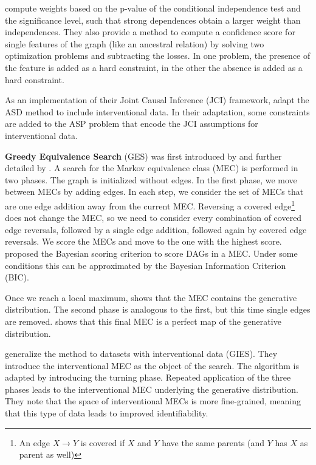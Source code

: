 \citet{magliacane2016ancestral} compute weights based on the p-value of the conditional independence test and the significance level, such that strong dependences obtain a larger weight than independences. They also provide a method to compute a confidence score for single features of the graph (like an ancestral relation) by solving two optimization problems and subtracting the losses. In one problem, the presence of the feature is added as a hard constraint, in the other the absence is added as a hard constraint. 

As an implementation of their Joint Causal Inference (JCI) framework, \citet{mooij2016joint} adapt the ASD method to include interventional data. In their adaptation, some constraints are added to the ASP problem that encode the JCI assumptions for interventional data.

\textbf{Greedy Equivalence Search} (GES) was first introduced by \citet{meek1997graphical} and further detailed by \citet{chickering2002optimal}. A search for the Markov equivalence class (MEC) is performed in two phases. The graph is initialized without edges. In the first phase, we move between MECs by adding edges. In each step, we consider the set of MECs that are one edge addition away from the current MEC. Reversing a covered edge\footnote{An edge $X\to Y$ is covered if $X$ and $Y$ have the same parents (and $Y$ has $X$ as parent as well)} does not change the MEC, so we need to consider every combination of covered edge reversals, followed by a single edge addition, followed again by covered edge reversals. We score the MECs and move to the one with the highest score. \citet{meek1997graphical} proposed the Bayesian scoring criterion to score DAGs in a MEC. Under some conditions this can be approximated by the Bayesian Information Criterion (BIC). 

Once we reach a local maximum, \citet{chickering2002optimal} shows that the MEC contains the generative distribution. The second phase is analogous to the first, but this time single edges are removed. \citet{chickering2002optimal} shows that this final MEC is a perfect map of the generative distribution.

\citet{hauser2012characterization} generalize the method to datasets with interventional data (GIES). They introduce the interventional MEC as the object of the search. The algorithm is adapted by introducing the turning phase. Repeated application of the three phases leads to the interventional MEC underlying the generative distribution. They note that the space of interventional MECs is more fine-grained, meaning that this type of data leads to improved identifiability.


